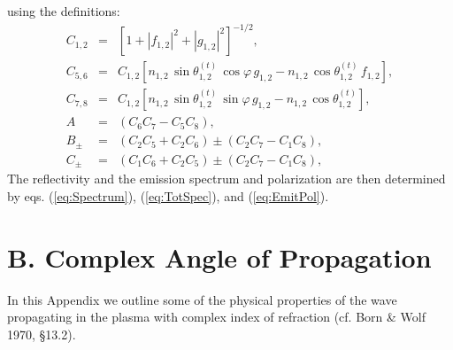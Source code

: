 \documentclass{emulateapj}
\begin{document}
using the definitions:
\begin{subequations}
\begin{eqnarray}
C_{1,2} & = & \left[1+\left|f_{1,2}\right|^2+\left|g_{1,2}\right|^2\right]^{-1/2} , \\
C_{5,6} & = & C_{1,2}\left[n_{1,2}\,\sin\theta^{(t)}_{1,2}\,\cos\varphi\,g_{1,2}-n_{1,2}\,\cos\theta^{(t)}_{1,2}\,f_{1,2}\right] , \\
C_{7,8} & = & C_{1,2}\left[n_{1,2}\,\sin\theta_{1,2}^{(t)}\,\sin\varphi\,g_{1,2}-n_{1,2}\,\cos\theta_{1,2}^{(t)}\right] , \\
A & = & (C_6 C_7-C_5 C_8) , \\
B_{\pm} & = & (C_2 C_5+C_2 C_6)\pm(C_2 C_7-C_1 C_8) , \\
C_{\pm} & = & (C_1 C_6+C_2 C_5)\pm(C_2 C_7-C_1 C_8) ,
\end{eqnarray}
\end{subequations}\hspace{-4pt}
The reflectivity and the emission spectrum and polarization are then determined by eqs. 
(\ref{eq:Spectrum}), 
(\ref{eq:TotSpec}), and (\ref{eq:EmitPol}).

\section{B. Complex Angle of Propagation}

In this Appendix we outline some of the physical properties of the wave 
propagating in the plasma with complex index of refraction
(cf. Born \& Wolf 1970, \S 13.2).
\end{document}

